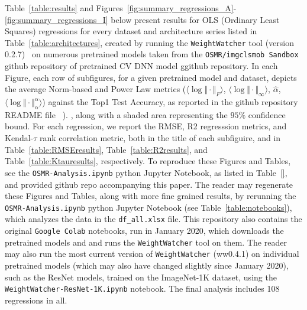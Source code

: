 Table~\ref{table:results} and Figures~\ref{fig:summary_regressions_A}-\ref{fig:summary_regressions_I} below present results for OLS 
(Ordinary Least Squares) regressions for every dataset and architecture series listed in Table~\ref{table:architectures},
 created by running the \texttt{WeightWatcher} tool (version 0.2.7)~\cite{weightwatcher_package}
on numerous pretrained models taken from the \texttt{OSMR/imgclsmob Sandbox} github repository of pretrained CV DNN model
ggithub repository. 
In each Figure,  each row of subfigures, for a given pretrained model and dataset, depicts the average Norm-based and Power Law metrics
 ($\langle\log\Vert\cdot\Vert_{F}\rangle$,    $\langle\log\Vert\cdot\Vert_{\infty}\rangle$,
$\hat{\alpha}$,  $\langle\log\Vert\cdot\Vert^{\alpha}_{\alpha}\rangle$)
 against the Top1 Test Accuracy, as reported in the github repository README file~\cite{osmr} ).
, along with a shaded area
representing the $95\%$ confidence bound.
For each regression, we report the RMSE, R2 regresssion metrics, and Kendal-$\tau$ rank correlation metric,
both in the title of each subfiguire, and in Table~\ref{table:RMSEresults}, Table~\ref{table:R2results}, and Table~\ref{table:Ktauresults}, respectively.
To reproduce these Figures and Tables, see the \texttt{OSMR-Analysis.ipynb} python Jupyter Notebook, as listed in Table~\ref{},
and provided github repo accompanying this paper.
The reader may regenerate these Figures and Tables,
along with more fine grained results, by rerunning
 the \texttt{OSMR-Analysis.ipynb} python Jupyter Notebook (see Table~\ref{table:notebooks}), which 
analyzes the data in the \texttt{df\_all.xlsx} file. 
This repository also contains the original \texttt{Google Colab} notebooks, run in January 2020, 
which downloads the pretrained models and  and runs the \texttt{WeightWatcher} tool on them.
The reader may also run the most current version of  \texttt{WeightWatcher} (ww0.4.1) on individual 
pretrained models (which may also have changed slightly since January 2020), 
such as the ResNet models, trained on the ImageNet-1K dataset, using the \texttt{WeightWatcher-ResNet-1K.ipynb} notebook.
The final analysis includes 108 regressions in all.%

